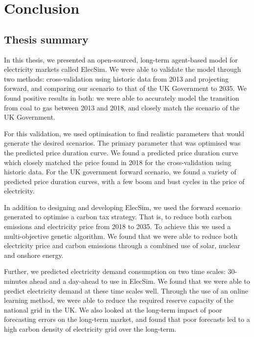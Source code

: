 \chapter{Conclusion}
\label{chapter:conclusion}
\ifpdf
    \graphicspath{{Chapter3/Figs/Raster/}{Chapter3/Figs/PDF/}{Chapter3/Figs/}}
\else
    \graphicspath{{Chapter3/Figs/Vector/}{Chapter3/Figs/}}
\fi


\section{Thesis summary}

In this thesis, we presented an open-sourced, long-term agent-based model for electricity markets called ElecSim. We were able to validate the model through two methods: cross-validation using historic data from 2013 and projecting forward, and comparing our scenario to that of the UK Government to 2035. We found positive results in both: we were able to accurately model the transition from coal to gas between 2013 and 2018, and closely match the scenario of the UK Government. 

For this validation, we used optimisation to find realistic parameters that would generate the desired scenarios. The primary parameter that was optimised was the predicted price duration curve. We found a predicted price duration curve which closely matched the price found in 2018 for the cross-validation using historic data. For the UK government forward scenario, we found a variety of predicted price duration curves, with a few boom and bust cycles in the price of electricity. 

In addition to designing and developing ElecSim, we used the forward scenario generated to optimise a carbon tax strategy. That is, to reduce both carbon emissions and electricity price from 2018 to 2035. To achieve this we used a multi-objective genetic algorithm. We found that we were able to reduce both electricity price and carbon emissions through a combined use of solar, nuclear and onshore energy.

Further, we predicted electricity demand consumption on two time scales: 30-minutes ahead and a day-ahead to use in ElecSim. We found that we were able to predict electricity demand at these time scales well. Through the use of an online learning method, we were able to reduce the required reserve capacity of the national grid in the UK. We also looked at the long-term impact of poor forecasting errors on the long-term market, and found that poor forecasts led to a high carbon density of electricity grid over the long-term.

